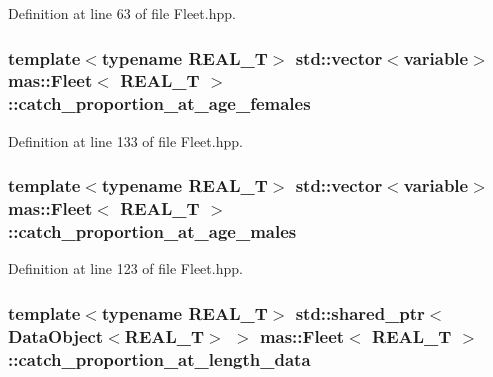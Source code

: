 Definition at line 63 of file Fleet.\-hpp.

\hypertarget{structmas_1_1_fleet_a6fc705bf1cfbe3641f610a98bc57402d}{
\subsubsection[{catch\-\_\-proportion\-\_\-at\-\_\-age\-\_\-females}]{\setlength{\rightskip}{0pt plus 5cm}template$<$typename R\-E\-A\-L\-\_\-\-T$>$ std\-::vector$<${\bf variable}$>$ {\bf mas\-::\-Fleet}$<$ R\-E\-A\-L\-\_\-\-T $>$\-::catch\-\_\-proportion\-\_\-at\-\_\-age\-\_\-females}}\label{structmas_1_1_fleet_a6fc705bf1cfbe3641f610a98bc57402d}


Definition at line 133 of file Fleet.\-hpp.

\hypertarget{structmas_1_1_fleet_a03a9617218d69139a286073025084dbd}{
\subsubsection[{catch\-\_\-proportion\-\_\-at\-\_\-age\-\_\-males}]{\setlength{\rightskip}{0pt plus 5cm}template$<$typename R\-E\-A\-L\-\_\-\-T$>$ std\-::vector$<${\bf variable}$>$ {\bf mas\-::\-Fleet}$<$ R\-E\-A\-L\-\_\-\-T $>$\-::catch\-\_\-proportion\-\_\-at\-\_\-age\-\_\-males}}\label{structmas_1_1_fleet_a03a9617218d69139a286073025084dbd}


Definition at line 123 of file Fleet.\-hpp.

\hypertarget{structmas_1_1_fleet_ae18e627f80c8ca519535bfc90d9634b5}{
\subsubsection[{catch\-\_\-proportion\-\_\-at\-\_\-length\-\_\-data}]{\setlength{\rightskip}{0pt plus 5cm}template$<$typename R\-E\-A\-L\-\_\-\-T$>$ std\-::shared\-\_\-ptr$<${\bf Data\-Object}$<$R\-E\-A\-L\-\_\-\-T$>$ $>$ {\bf mas\-::\-Fleet}$<$ R\-E\-A\-L\-\_\-\-T $>$\-::catch\-\_\-proportion\-\_\-at\-\_\-length\-\_\-data}}\label{structmas_1_1_fleet_ae18e627f80c8ca519535bfc90d9634b5}


